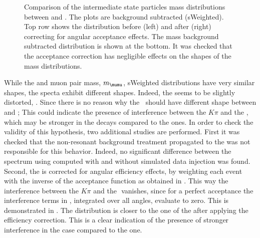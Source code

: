 \begin{figure}[!t]
  \centering
  \begin{subfigure}{0.5\textwidth}
    \scalebox{0.56}{}
    \caption{}
    \label{mkpiPlot_raw}
  \end{subfigure}%
  \hfill%
  \begin{subfigure}{0.5\textwidth}
    \scalebox{0.56}{}
    \caption{}
    \label{mkpiPlot_eff}
  \end{subfigure}
  \begin{subfigure}{0.5\textwidth}
    \scalebox{0.56}{}
    \caption{}
    \label{jpsiPlot}
  \end{subfigure}
\caption{Comparison of the intermediate state particles mass distributions between \Bs and \Bd.
         The plots are background subtracted (sWeighted). Top row shows the \mkpi distribution before (left)
         and after (right) correcting for angular acceptance effects. The \jpsi mass background subtracted
         distribution is shown at the bottom. It was checked that the acceptance correction has negligible
         effects on the shapes of the \jpsi mass distributions.}
\end{figure}

While the \Bs and \Bd muon pair mass, $m_\mumu$, sWeighted distributions have very similar shapes, the \mkpi specta exhibit different shapes.
Indeed, the \Bs \mkpi \sPlot seems to be slightly distorted, . Since there is no \aprior reason why the \Kst$~$\pwave
should have different shape between \BsJpsiKst and \BdJpsiKst; This could indicate the presence of interference between
the $K\pi$ \swave and the \Kstarz, which may be stronger in the \Bs decays compared to the \Bd ones. In order
to check the validity of this hypothesis, two additional studies are performed. First it was checked that the non-resonant
background treatment propagated to the \sWeights was not responsible for this behavior. Indeed, no significant difference
between the \Bs \mkpi spectrum using \sWeights computed with and without simulated data injection was found. Second, the \mkpi
is corrected for angular efficiency effects, by weighting each event with the inverse of the acceptance function as obtained
in . This way the interference between the $K\pi$ \swave and the \Kstarz $ $ \pwave vanishes, since
for a perfect acceptance the interference terms in , integrated over all angles, evaluate to zero.
This is demonstrated in . The \Bs \mkpi distribution is closer to the one of the \Bd after applying
the efficiency correction. This is a clear indication of the presence of stronger interference in the \Bs case compared to the \Bd one.

